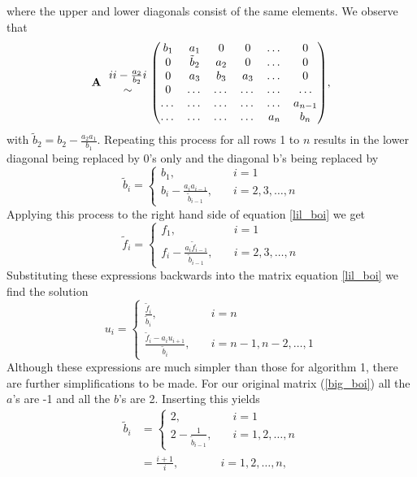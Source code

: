 \documentclass[notitlepage, reprint, nofootinbib]{revtex4-1}
\begin{document}
where the upper and lower diagonals consist of the same elements. We observe that 
$$\vb{A}\ \ \mqty{\uppercase\expandafter{\romannumeral 2}-\frac{a_2}{b_2}\uppercase\expandafter{\romannumeral 1}\\ \sim}\ \mqty(b_1&a_1&0&0&\dots&0\\0&\tilde{b}_2&a_2&0&\dots&0\\0&a_3&b_3&a_3&\dots&0\\ 0&\dots&\dots&\dots&\dots&\dots\\ \dots&\dots&\dots&\dots&\dots&a_{n-1}\\ \dots&\dots&\dots&\dots&a_n&b_n),$$
with $\tilde{b}_2=b_2-\frac{a_2a_1}{b_1}$. Repeating this process for all rows 1 to $n$ results in the lower diagonal being replaced by 0's only and the diagonal b's being replaced by 
\begin{equation}\label{b_tilde_ein} \tilde{b}_i=\begin{cases} b_1, \quad &i=1 \\ b_i - \frac{a_i a_{i-1}}{\tilde{b}_{i-1}},\quad &i=2, 3,\dots, n\end{cases}\end{equation}
Applying this process to the right hand side of equation \ref{lil_boi} we get
\begin{equation}\label{f_tilde_ein}\tilde{f}_i=\begin{cases}f_1,\quad &i=1\\ f_i-\frac{a_i \tilde{f}_{i-1}}{\tilde{b}_{i-1}},\quad&i=2,3,\dots,n\end{cases}\end{equation}
Substituting these expressions backwards into the matrix equation {\ref{lil_boi}} we find the solution
\begin{equation}\label{general_u_ein}u_i=\begin{cases}\frac{\tilde{f}_i}{\tilde{b}_i},\quad&i=n\\ \frac{\tilde{f}_i-a_i u_{i+1}}{\tilde{b}_i},\quad&i=n-1,n-2,\dots,1\end{cases}\end{equation}
Although these expressions are much simpler than those for algorithm 1, there are further simplifications to be made. For our original matrix (\ref{big_boi}) all the $a$'s are -1 and all the $b$'s are 2. Inserting this yields
\begin{align}
	\tilde{b}_i &= \begin{cases}2,\quad&i=1\\2-\frac{1}{\tilde{b}_{i-1}},\quad&i=1,2,\dots,n\end{cases}\nonumber\\
	&=\frac{i+1}{i},\quad \quad \quad \ \ \ i=1,2,\dots, n,\label{algo2b}
\end{align}
\end{document}
